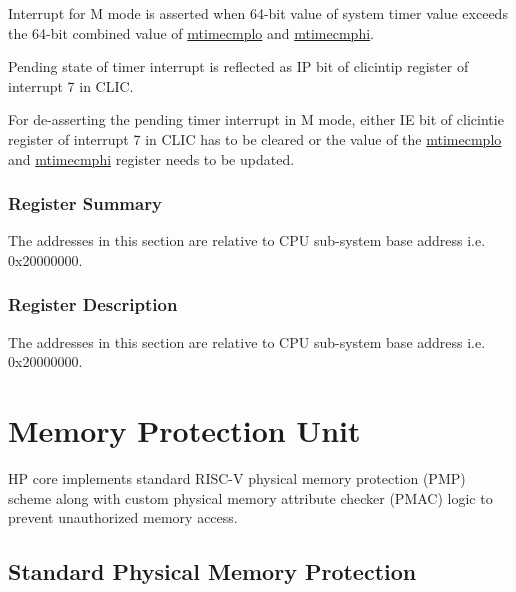 \documentclass[main\_\_EN.tex]{subfiles}
\begin{document}
Interrupt for M mode is asserted when 64-bit value of system timer value exceeds the 64-bit combined value of \hyperref[regdesc:CLINTMTIMECMPLOREG]{mtimecmplo} and \hyperref[regdesc:CLINTMTIMECMPHIREG]{mtimecmphi}.

Pending state of timer interrupt is reflected as IP bit of clicintip register of interrupt 7 in CLIC.

For de-asserting the pending timer interrupt in M mode, either IE bit of clicintie register of interrupt 7 in CLIC has to be cleared or the value of the \hyperref[regdesc:CLINTMTIMECMPLOREG]{mtimecmplo} and \hyperref[regdesc:CLINTMTIMECMPHIREG]{mtimecmphi} register needs to be updated.


\hypertarget{riscvcpu-clint-reg-summ}{}
\subsubsection{Register Summary}
\label{sec:riscvcpu-clint-reg-summ}

The addresses in this section are relative to CPU sub-system base address i.e. 0x20000000.





\subsubsection{Register Description}

The addresses in this section are relative to CPU sub-system base address i.e. 0x20000000.



\newpage
\section{Memory Protection Unit}
HP core implements standard RISC-V physical memory protection (PMP) scheme along with custom physical memory attribute checker (PMAC) logic to prevent unauthorized memory access.

\subsection{Standard Physical Memory Protection}
\label{sec:riscvcpu-pmp}
\end{document}
